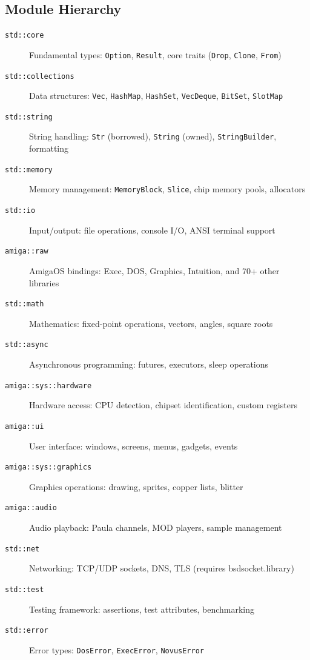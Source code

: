 \subsection{Module Hierarchy}

\begin{description}
    \item[\texttt{std::core}] Fundamental types: \texttt{Option}, \texttt{Result}, core traits (\texttt{Drop}, \texttt{Clone}, \texttt{From})

    \item[\texttt{std::collections}] Data structures: \texttt{Vec}, \texttt{HashMap}, \texttt{HashSet}, \texttt{VecDeque}, \texttt{BitSet}, \texttt{SlotMap}

    \item[\texttt{std::string}] String handling: \texttt{Str} (borrowed), \texttt{String} (owned), \texttt{StringBuilder}, formatting

    \item[\texttt{std::memory}] Memory management: \texttt{MemoryBlock}, \texttt{Slice}, chip memory pools, allocators

    \item[\texttt{std::io}] Input/output: file operations, console I/O, ANSI terminal support

    \item[\texttt{amiga::raw}] AmigaOS bindings: Exec, DOS, Graphics, Intuition, and 70+ other libraries

    \item[\texttt{std::math}] Mathematics: fixed-point operations, vectors, angles, square roots

    \item[\texttt{std::async}] Asynchronous programming: futures, executors, sleep operations

    \item[\texttt{amiga::sys::hardware}] Hardware access: CPU detection, chipset identification, custom registers

    \item[\texttt{amiga::ui}] User interface: windows, screens, menus, gadgets, events

    \item[\texttt{amiga::sys::graphics}] Graphics operations: drawing, sprites, copper lists, blitter

    \item[\texttt{amiga::audio}] Audio playback: Paula channels, MOD players, sample management

    \item[\texttt{std::net}] Networking: TCP/UDP sockets, DNS, TLS (requires bsdsocket.library)

    \item[\texttt{std::test}] Testing framework: assertions, test attributes, benchmarking

    \item[\texttt{std::error}] Error types: \texttt{DosError}, \texttt{ExecError}, \texttt{NovusError}
\end{description}

